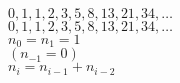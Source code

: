 \documentclass[varwidth,convert={density=2000,size=2000x,outext=.png}]{standalone}
\begin{document}
\begin{center}
$0,1,1,2,3,5,8,13,21,34,\ldots$\\
$0,1,1,2,3,5,8,13,21,34,\ldots$\\
$n_0=n_1=1$\\
$(n_{-1}=0)$\\
$n_i=n_{i-1}+n_{i-2}$
\end{center}
\end{document}
